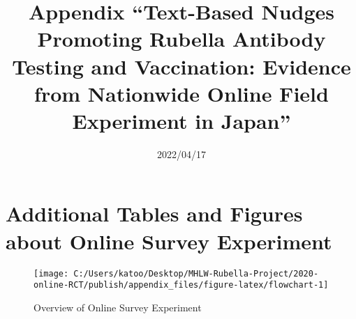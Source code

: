 \documentclass[
  11pt,
  a4paper,
]{article}
\title{Appendix
``Text-Based Nudges Promoting Rubella Antibody Testing and Vaccination:
Evidence from Nationwide Online Field Experiment in Japan''  }
\date{2022/04/17}
\begin{document}
\begin{spacing}{1}
  \maketitle
\end{spacing}

{
\setcounter{tocdepth}{2}
\tableofcontents
}
\hypertarget{appendix-appendix}{%
\appendix}


\clearpage

\hypertarget{additional-tables-and-figures-about-online-survey-experiment}{%
\section{Additional Tables and Figures about Online Survey Experiment}\label{additional-tables-and-figures-about-online-survey-experiment}}

\begin{figure}[t]
\texttt{[image: C:/Users/katoo/Desktop/MHLW-Rubella-Project/2020-online-RCT/publish/appendix\_files/figure-latex/flowchart-1]} \caption{Overview of Online Survey Experiment}\label{fig:flowchart}
\end{figure}
\end{document}
